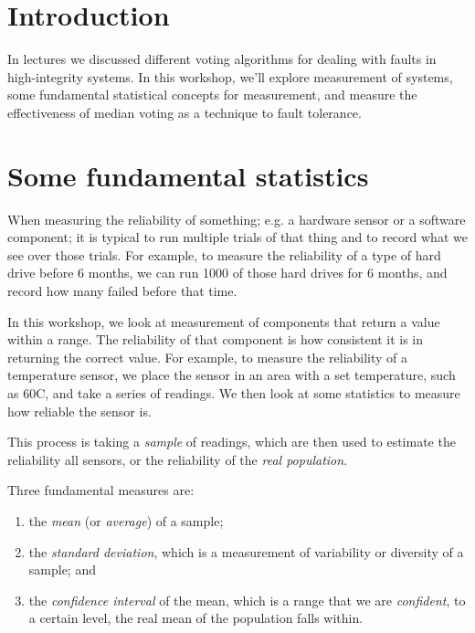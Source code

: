 \documentclass{article}
\begin{document}
%
\lstset{language=,aboveskip=3mm}


\section*{Introduction}

In lectures we discussed different voting algorithms for dealing with faults in high-integrity systems. In this workshop, we'll explore measurement of systems, some fundamental statistical concepts for measurement, and measure the effectiveness of median voting as a technique to fault tolerance.

\section*{Some fundamental statistics}

When measuring the reliability of something; e.g. a hardware sensor or a software component; it is typical to run multiple trials of that thing and to record what we see over those trials. For example, to measure the reliability of a type of hard drive before 6 months, we can run 1000 of those hard drives for 6 months, and record how many failed before that time.

In this workshop, we look at measurement of components that return a value within a range. The reliability of that component is how consistent it is in returning the correct value. For example, to measure the reliability of a temperature sensor, we place the sensor in an area with a set temperature, such as 60C, and take a series of readings. We then look at some statistics to measure how reliable the sensor is.

This process is taking a {\em sample} of readings, which are then used to estimate the reliability all sensors, or the reliability of the \emph{real population}.

Three fundamental measures are:

\begin{enumerate}
 \item the {\em mean} (or {\em average}) of a sample;
 \item the {\em standard deviation}, which is a measurement of variability or diversity of a sample; and
 \item the {\em confidence interval} of the mean, which is a range    that we are {\em confident}, to a certain level, the real mean of the population falls    within.
\end{enumerate}
\end{document}
